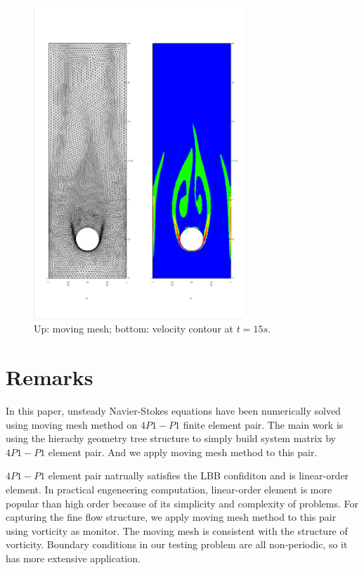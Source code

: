 \documentclass[a4paper, 11pt]{article}
\begin{document}
    \begin{figure}[!htbp]
        \centering
        \includegraphics[width = 0.7\textwidth, angle = -90]{picture/obstacle_flow_data/mesh_t_15s.eps}
        \caption{\small Up: moving mesh; bottom: velocity contour at
          $t = 15s$.}
        \label{fig::cylinder_mesh_t15s}
      \end{figure}


   \section{Remarks}

   In this paper, unsteady Navier-Stokes equations have been numerically 
   solved using moving mesh method on $4P1-P1$ finite element
   pair. The main work is using the hierachy geometry tree structure
   to simply build system matrix by $4P1-P1$ element pair. And we
   apply moving mesh method to this pair. 
    
   $4P1-P1$ element pair natrually satisfies the LBB confiditon and is
   linear-order element. In practical engeneering computation,
   linear-order element is more popular than high order because of its
   simplicity and complexity of problems. For capturing the fine flow
   structure, we apply moving mesh method to this pair using vorticity
   as monitor. The moving mesh is consistent with the structure of
   vorticity. Boundary conditions in our testing problem are all
   non-periodic, so it has more extensive application.
   
\end{document}
